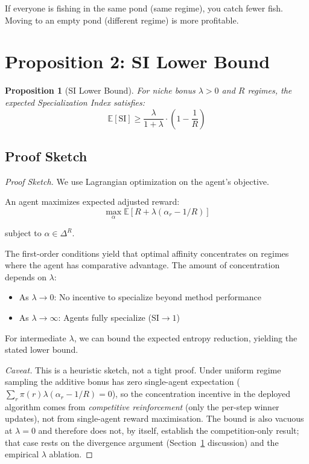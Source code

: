 \documentclass[11pt,a4paper]{article}
\theoremstyle{definition}
\theoremstyle{plain}
\newtheorem{proposition}{Proposition}[section]
\newcommand{\E}{\mathbb{E}}
\newcommand{\SI}{\text{SI}}
\begin{document}
\begin{intuition}
If everyone is fishing in the same pond (same regime), you catch fewer fish. Moving to an empty pond (different regime) is more profitable.
\end{intuition}

\section{Proposition 2: SI Lower Bound}

\begin{proposition}[SI Lower Bound]
\label{prop:si-lower-bound}
For niche bonus $\lambda > 0$ and $R$ regimes, the expected Specialization Index satisfies:
\begin{equation}
\E[\SI] \geq \frac{\lambda}{1 + \lambda} \cdot \left(1 - \frac{1}{R}\right)
\end{equation}
\end{proposition}

\subsection{Proof Sketch}

\begin{proof}[Proof Sketch]
We use Lagrangian optimization on the agent's objective.

An agent maximizes expected adjusted reward:
\begin{equation}
\max_{\alpha} \E[R + \lambda(\alpha_r - 1/R)]
\end{equation}

subject to $\alpha \in \Delta^R$.

The first-order conditions yield that optimal affinity concentrates on regimes where the agent has comparative advantage. The amount of concentration depends on $\lambda$:

\begin{itemize}
    \item As $\lambda \to 0$: No incentive to specialize beyond method performance
    \item As $\lambda \to \infty$: Agents fully specialize ($\SI \to 1$)
\end{itemize}

For intermediate $\lambda$, we can bound the expected entropy reduction, yielding the stated lower bound.

\emph{Caveat.} This is a heuristic sketch, not a tight proof. Under uniform regime
sampling the additive bonus has zero single-agent expectation
($\sum_r \pi(r)\lambda(\alpha_r-1/R)=0$), so the concentration incentive in the
deployed algorithm comes from \emph{competitive reinforcement} (only the per-step
winner updates), not from single-agent reward maximisation. The bound is also
vacuous at $\lambda=0$ and therefore does not, by itself, establish the
competition-only result; that case rests on the divergence argument
(Section~\ref{prop:si-lower-bound} discussion) and the empirical $\lambda$ ablation.
\end{proof}
\end{document}
